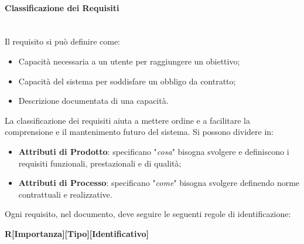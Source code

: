 \paragraph{Classificazione dei Requisiti} \-\\
Il requisito si può definire come:
\begin{itemize}
	\item Capacità necessaria a un utente per raggiungere un obiettivo;
	\item Capacità del sistema per soddisfare un obbligo da contratto;
	\item Descrizione documentata di una capacità.
\end{itemize}
La classificazione dei requisiti aiuta a mettere ordine e a facilitare la comprensione e il mantenimento futuro del sistema. Si possono dividere in:
\begin{itemize}
	\item \textbf{Attributi di Prodotto}: specificano "\textit{cosa}" bisogna svolgere e definiscono i requisiti funzionali, prestazionali e di qualità;
	\item \textbf{Attributi di Processo}: specificano "\textit{come}" bisogna svolgere definendo norme contrattuali e realizzative.
\end{itemize}
Ogni requisito, nel documento, deve seguire le seguenti regole di identificazione:
\begin{center}
\textbf{R[Importanza][Tipo][Identificativo]}
\end{center}
